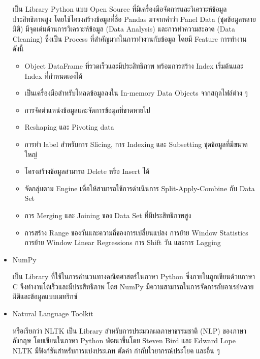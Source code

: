 \documentclass[12pt,oneside,openright,a4paper]{cpe-thai-project}
\begin{document}
\begin{itemize}
      \hspace{1cm}เป็น Library Python แบบ Open Source ที่มีเครื่องมือจัดการและวิเคราะห์ข้อมูลประสิทธิภาพสูง
      โดยใช้โครงสร้างข้อมูลที่ชื่อ Pandas มาจากคำว่า Panel Data (ชุดข้อมูลหลายมิติ) มีจุดเด่นด้านการวิเคราะห์ข้อมูล (Data Analysis) 
      และการทำความสะอาด (Data Cleaning) ซึ่งเป็น Process ที่สำคัญมากในการทำงานกับข้อมูล โดยมี Feature การทำงานดังนี้ \cite{pandas}
        \begin{itemize}
          \item Object DataFrame ที่รวดเร็วและมีประสิทธิภาพ พร้อมการสร้าง Index เริ่มต้นและ Index ที่กำหนดเองได้
          \item เป็นเครื่องมือสำหรับโหลดข้อมูลลงใน In-memory Data Objects จากสกุลไฟล์ต่าง ๆ
          \item การจัดตำแหน่งข้อมูลและจัดการข้อมูลที่ขาดหายไป
          \item Reshaping และ Pivoting data
          \item การทำ label สำหรับการ Slicing, การ Indexing และ Subsetting ชุดข้อมูลที่มีขนาดใหญ่
          \item โครงสร้างข้อมูลสามารถ Delete หรือ Insert ได้
          \item จัดกลุ่มตาม Engine เพื่อให้สามารถใช้การดำเนินการ Split-Apply-Combine กับ Data Set
          \item การ Merging และ Joining ของ Data Set ที่มีประสิทธิภาพสูง
          \item การสร้าง Range ของวันและความถี่ของการเปลี่ยนแปลง การย้าย Window Statistics การย้าย Window Linear Regressions การ Shift วัน และการ Lagging
        \end{itemize}
        
      \item NumPy
      
      \hspace{1cm}เป็น Library ที่ใช้ในการคำนวนทางคณิตศาสตร์ในภาษา Python \cite{numpy} ซึ่งภายในถูกเขียนด้วยภาษา C จึงทำงานได้เร็วและมีประสิทธิภาพ 
      โดย NumPy มีความสามารถในการจัดการกับอาเรย์หลายมิติและข้อมูลแบบเมทริกซ์
      
      \item Natural Language Toolkit
      
      \hspace{1cm}หรือเรียกว่า NLTK เป็น Library สำหรับการประมวลผลภาษาธรรมชาติ (NLP) ของภาษาอังกฤษ โดยเขียนในภาษา Python 
      พัฒนาขึ้นโดย Steven Bird และ Edward Lope NLTK มีฟังก์ชันสำหรับการแบ่งประเภท ตัดคำ กำกับไวยากรณ์ประโยค และอื่น ๆ
      

\end{itemize}
\end{document}
